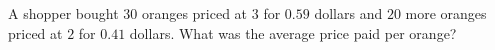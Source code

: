A shopper bought $30$ oranges priced at $3$ for $0.59$ dollars and $20$ more oranges priced at $2$ for $0.41$ dollars. What was the average price paid per orange?
